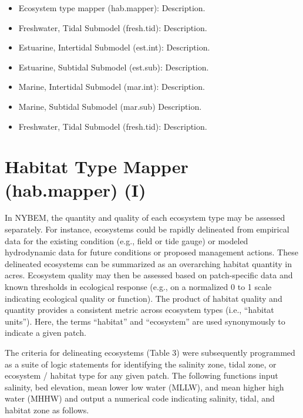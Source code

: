 \documentclass[
]{book}
\providecommand{\tightlist}{%
  \setlength{\itemsep}{0pt}\setlength{\parskip}{0pt}}
\begin{document}
\begin{itemize}
\tightlist
\item
  Ecosystem type mapper (hab.mapper): Description.\\
\item
  Freshwater, Tidal Submodel (fresh.tid): Description.\\
\item
  Estuarine, Intertidal Submodel (est.int): Description.\\
\item
  Estuarine, Subtidal Submodel (est.sub): Description.\\
\item
  Marine, Intertidal Submodel (mar.int): Description.\\
\item
  Marine, Subtidal Submodel (mar.sub) Description.\\
\item
  Freshwater, Tidal Submodel (fresh.tid): Description.
\end{itemize}

\hypertarget{habitat-type-mapper-hab.mapper-i}{%
\section{Habitat Type Mapper (hab.mapper) (I)}\label{habitat-type-mapper-hab.mapper-i}}

In NYBEM, the quantity and quality of each ecosystem type may be assessed separately. For instance, ecosystems could be rapidly delineated from empirical data for the existing condition (e.g., field or tide gauge) or modeled hydrodynamic data for future conditions or proposed management actions. These delineated ecosystems can be summarized as an overarching habitat quantity in acres. Ecosystem quality may then be assessed based on patch-specific data and known thresholds in ecological response (e.g., on a normalized 0 to 1 scale indicating ecological quality or function). The product of habitat quality and quantity provides a consistent metric across ecosystem types (i.e., ``habitat units''). Here, the terms ``habitat'' and ``ecosystem'' are used synonymously to indicate a given patch.

The criteria for delineating ecosystems (Table 3) were subsequently programmed as a suite of logic statements for identifying the salinity zone, tidal zone, or ecosystem / habitat type for any given patch. The following functions input salinity, bed elevation, mean lower low water (MLLW), and mean higher high water (MHHW) and output a numerical code indicating salinity, tidal, and habitat zone as follows.
\end{document}
